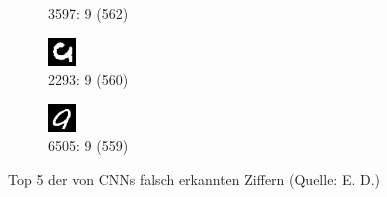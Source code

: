 \documentclass[
	a4paper,
	12pt,
	ngerman,
	oneside
]{scrreprt}											%
\begin{document}
\begin{figure}[h]
\begin{subfigure}[t]{.19\linewidth}
					\caption{3597: 9 (562)}
				\end{subfigure}
				\begin{subfigure}[t]{.19\linewidth}
					\centering
					\includegraphics[height=0.6\linewidth]{imagesAndGraphData/top5CNN/9-2293.png}
					\caption{2293: 9 (560)}
				\end{subfigure}
				\begin{subfigure}[t]{.19\linewidth}
					\centering
					\includegraphics[height=0.6\linewidth]{imagesAndGraphData/top5CNN/9-6505.png}
					\caption{6505: 9 (559)}
				\end{subfigure}
				
				\vspace*{-2mm}
				\caption{Top 5 der von CNNs falsch erkannten Ziffern (Quelle: E. D.)}\label{top5CNN}
			\end{figure}
			\vspace*{-3mm}
\end{document}
